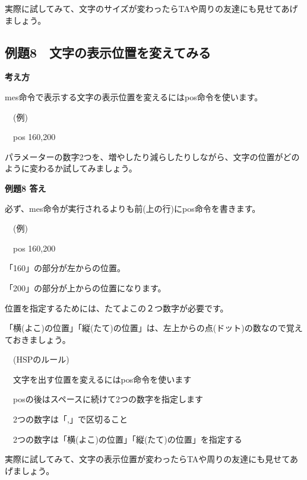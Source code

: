 \documentclass[a4paper,12pt]{jarticle}
\begin{document}
実際に試してみて、文字のサイズが変わったらTAや周りの友達にも見せてあげましょう。


\clearpage
\subsection{例題8　文字の表示位置を変えてみる}
\bigskip
\bigskip

{\bfseries
考え方}

\bigskip

mes命令で表示する文字の表示位置を変えるにはpos命令を使います。


\bigskip

\ \ (例)

\ \ pos 160,200


\bigskip

パラメーターの数字2つを、増やしたり減らしたりしながら、文字の位置がどのように変わるか試してみましょう。

\bigskip

\bigskip

{\bfseries
例題8 答え}

\bigskip

必ず、mes命令が実行されるよりも前(上の行)にpos命令を書きます。


\bigskip

\ \ (例)

\ \ pos 160,200


\bigskip

「160」の部分が左からの位置。

「200」の部分が上からの位置になります。

位置を指定するためには、たてよこの２つ数字が必要です。

「横(よこ)の位置」「縦(たて)の位置」は、左上からの点(ドット)の数なので覚えておきましょう。


\bigskip

\ \ (HSPのルール)


\bigskip

\ \ 文字を出す位置を変えるにはpos命令を使います

\ \ posの後はスペースに続けて2つの数字を指定します

\ \ 2つの数字は「,」で区切ること

\ \ 2つの数字は「横(よこ)の位置」「縦(たて)の位置」を指定する


\bigskip

実際に試してみて、文字の表示位置が変わったらTAや周りの友達にも見せてあげましょう。
\end{document}
